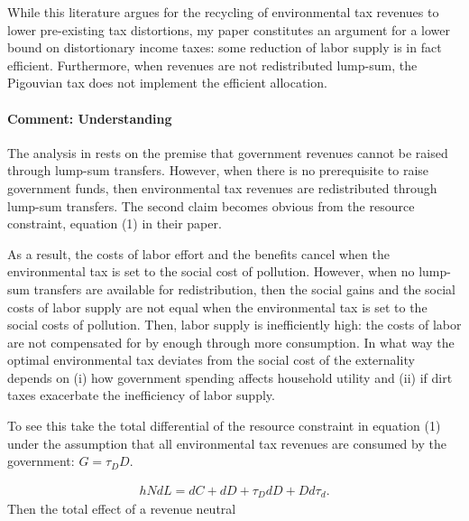  While this literature argues for the recycling of environmental tax revenues to lower pre-existing tax distortions, my paper constitutes an argument for a lower bound on distortionary income taxes: some reduction of labor supply is in fact efficient. 
Furthermore, when revenues are not redistributed lump-sum, the Pigouvian tax does not implement the efficient allocation. 

\paragraph{Comment: Understanding \cite{LansBovenberg1994EnvironmentalTaxation}}

The analysis in \cite{LansBovenberg1994EnvironmentalTaxation} rests on the premise that government revenues cannot be raised through lump-sum transfers. However, when there is no prerequisite to raise government funds, then environmental tax revenues are redistributed through lump-sum transfers. The second claim becomes obvious from the resource constraint, equation (1) in their paper. 

As a result, the costs of labor effort and the benefits cancel when the environmental tax is set to the social cost of pollution. However, when no lump-sum transfers are available for redistribution, then the social gains and the social costs of labor supply are not equal when the environmental tax is set to the social costs of pollution. Then, labor supply is inefficiently high: the costs of labor are not compensated for by enough through more consumption. In what way the optimal environmental tax deviates from the social cost of the externality depends on (i) how government spending affects household utility and (ii) if dirt taxes exacerbate the inefficiency of labor supply. 

To see this take the total differential of the resource constraint in \cite{LansBovenberg1994EnvironmentalTaxation} equation (1) under the assumption that all environmental tax revenues are consumed by the government: $G=\tau_D D$.

\begin{align}
hNdL = dC+dD+\tau_D dD +D d\tau_d.
\end{align}
 Then the total effect of a revenue neutral 


